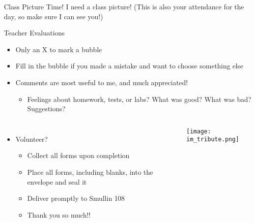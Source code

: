 \documentclass[pdf,aspectratio=169]{beamer}
\begin{document}
\begin{frame}{Class Picture Time!}
  I need a class picture! (This is also your attendance for the day, so make sure I can see you!)
\end{frame}

\begin{frame}{Teacher Evaluations}
  \begin{itemize}
	\item Only an X to mark a bubble
	\item Fill in the bubble if you made a mistake and want to choose something else
	\item Comments are most useful to me, and much appreciated!
	  \begin{itemize}
		\item Feelings about homework, tests, or labs? What was good? What was bad? Suggestions?
	  \end{itemize}
  \end{itemize}
  \begin{columns}
	\begin{itemize}
	  \item Volunteer?
		\begin{itemize}
		  \item Collect all forms upon completion
		  \item Place all forms, \alert{including blanks}, into the envelope and seal it
		  \item Deliver promptly to Smullin 108
		  \item Thank you so much!!
		\end{itemize}
	\end{itemize}
	\begin{center}
	  \texttt{[image: im\_tribute.png]}
	\end{center}
  \end{columns}
\end{frame}
\end{document}
